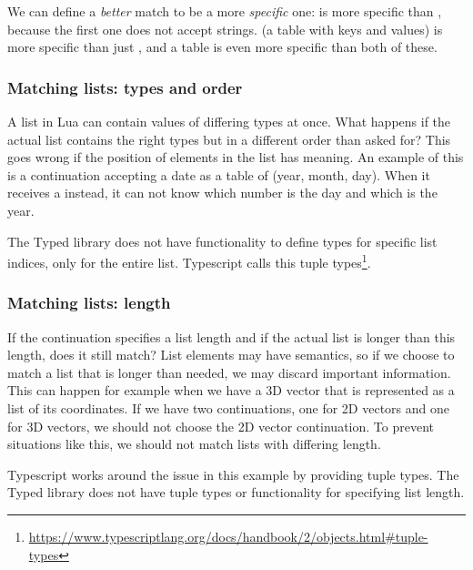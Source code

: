 We can define a \textit{better} match to be a more \textit{specific} one:  is more specific than , because the first one does not accept strings.  (a table with  keys and  values) is more specific than just , and a table  is even more specific than both of these.

\subsubsection{Matching lists: types and order}
A list in Lua can contain values of differing types at once. What happens if the actual list contains the right types but in a different order than asked for?
This goes wrong if the position of elements in the list has meaning. An example of this is a continuation accepting a date as a table of  (year, month, day). When it receives a  instead, it can not know which number is the day and which is the year.

The Typed library does not have functionality to define types for specific list indices, only for the entire list. Typescript calls this tuple types\footnote{\label{footnote-typescript-tuple-types}\url{https://www.typescriptlang.org/docs/handbook/2/objects.html#tuple-types}}.

\subsubsection{Matching lists: length}
If the continuation specifies a list length and if the actual list is longer than this length, does it still match? List elements may have semantics, so if we choose to match a list that is longer than needed, we may discard important information. This can happen for example when we have a 3D vector that is represented as a list of its coordinates. If we have two continuations, one for 2D vectors and one for 3D vectors, we should not choose the 2D vector continuation. To prevent situations like this, we should not match lists with differing length.

Typescript works around the issue in this example by providing tuple types. The Typed library does not have tuple types or functionality for specifying list length.

